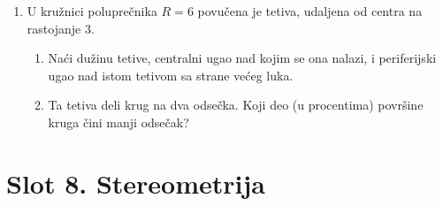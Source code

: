 \begin{enumerate}[label=\arabic*.]
\item U kružnici poluprečnika $R=6$ povučena je tetiva, udaljena od centra na rastojanje $3$.
\begin{enumerate}[label=\alph*)]
\item Naći dužinu tetive, centralni ugao nad kojim se ona nalazi, i periferijski ugao nad istom tetivom sa strane većeg luka.
\item Ta tetiva deli krug na dva odsečka. Koji deo (u procentima) površine kruga čini manji odsečak?
\end{enumerate}

\end{enumerate}
\clearpage
\section*{Slot 8. Stereometrija}
